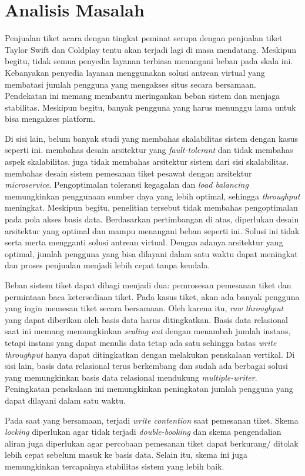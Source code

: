
\section{Analisis Masalah}

Penjualan tiket acara dengan tingkat peminat serupa dengan penjualan tiket Taylor Swift dan Coldplay tentu akan terjadi lagi di masa mendatang. Meskipun begitu, tidak semua penyedia layanan terbiasa menangani beban pada skala ini. Kebanyakan penyedia layanan menggunakan solusi antrean virtual yang membatasi jumlah pengguna yang mengakses situs secara bersamaan. Pendekatan ini memang membantu meringankan beban sistem dan menjaga stabilitas. Meskipun begitu, banyak pengguna yang harus menunggu lama untuk bisa mengakses platform.

Di sisi lain, belum banyak studi yang membahas skalabilitas sistem dengan kasus seperti ini. \cite{microservicesEventDriven} membahas desain arsitektur yang \textit{fault-tolerant} dan tidak membahas aspek skalabilitas. \cite{backendForTicketing} juga tidak membahas arsitektur sistem dari sisi skalabilitas. \cite{barua2024enhancingresiliencescalabilitytravel} membahas desain sistem pemesanan tiket pesawat dengan arsitektur \textit{microservice}. Pengoptimalan toleransi kegagalan dan \textit{load balancing} memungkinkan penggunaan sumber daya yang lebih optimal, sehingga \textit{throughput} meningkat. Meskipun begitu, penelitian tersebut tidak membahas pengoptimalan pada pola akses basis data. Berdasarkan pertimbangan di atas, diperlukan desain arsitektur yang optimal dan mampu menangani beban seperti ini. Solusi ini tidak serta merta mengganti solusi antrean virtual. Dengan adanya arsitektur yang optimal, jumlah pengguna yang bisa dilayani dalam satu waktu dapat meningkat dan proses penjualan menjadi lebih cepat tanpa kendala.

Beban sistem tiket dapat dibagi menjadi dua: pemrosesan pemesanan tiket dan permintaan baca ketersediaan tiket. Pada kasus tiket, akan ada banyak pengguna yang ingin memesan tiket secara bersamaan. Oleh karena itu, \textit{raw throughput} yang dapat diberikan oleh basis data harus ditingkatkan. Basis data relasional saat ini memang memungkinkan \textit{scaling out} dengan menambah jumlah instans, tetapi instans yang dapat menulis data tetap ada satu sehingga batas \textit{write throughput} hanya dapat ditingkatkan dengan melakukan penskalaan vertikal. Di sisi lain, basis data relasional terus berkembang dan sudah ada berbagai solusi yang memungkinkan basis data relasional mendukung \textit{multiple-writer}. Peningkatan penskalaan ini memungkinkan peningkatan jumlah pengguna yang dapat dilayani dalam satu waktu.

Pada saat yang bersamaan, terjadi \textit{write contention} saat pemesanan tiket. Skema \textit{locking} diperlukan agar tidak terjadi \textit{double-booking} dan skema pengendalian aliran juga diperlukan agar percobaan pemesanan tiket dapat berkurang/ ditolak lebih cepat sebelum masuk ke basis data. Selain itu, skema ini juga memungkinkan tercapainya stabilitas sistem yang lebih baik.